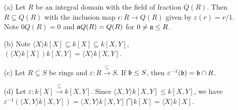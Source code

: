 \begin{example}
    \begin{enumerate}
        \item[(a)] Let $R$ be an integral domain with the field of fraction $Q(R)$. Then $R \subseteq Q(R)$ with the inclusion map $\epsilon:R \to Q(R)$ given by $\varepsilon(r) = r/1$. Note $0Q(R) = 0$ and $\mathfrak{a} Q(R) = Q(R)$ for $0 \neq \mathfrak{a} \leq R$.
        \item[(b)] Note $\langle X\rangle k[X] \subseteq k[X] \subseteq k[X,Y]$, $\left(\langle X \rangle k[X]\right)k[X,Y] = \langle X \rangle k[X,Y]$.
        \item[(c)] Let $R \subseteq S$ be rings and $\varepsilon: R \xrightarrow \subseteq S$. If $\mathfrak{b} \leq S$, then $\varepsilon^{-1}(\mathfrak{b}) = \mathfrak{b} \cap R$.
        \item[(d)] Let $\varepsilon : k[X] \xrightarrow{\subseteq} k[X,Y]$. Since $\langle X,Y \rangle k[X,Y] \leq k[X,Y]$, we have $\varepsilon^{-1}(\langle X,Y \rangle k[X,Y]) = \langle X,Y \rangle k[X,Y] \textstyle \bigcap k[X] = \langle X \rangle k[X]$.
    \end{enumerate}
\end{example}

